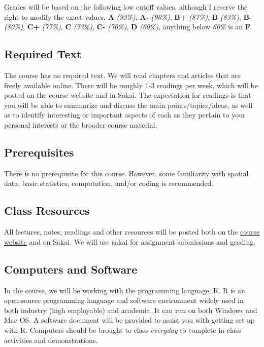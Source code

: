 \documentclass[11pt,]{article}
\begin{document}
Grades will be based on the following low cutoff values, although I
reserve the right to modify the exact values: \textbf{A} \emph{(93\%)},
\textbf{A-} \emph{(90\%)}, \textbf{B+} \emph{(87\%)}, \textbf{B}
\emph{(83\%)}, \textbf{B-} \emph{(80\%)}, \textbf{C+} \emph{(77\%)},
\textbf{C} \emph{(73\%)}, \textbf{C-} \emph{(70\%)}, \textbf{D}
\emph{(60\%)}, anything below \emph{60\%} is an \textbf{F}

\hypertarget{required-text}{%
\subsection{Required Text}\label{required-text}}

The course has no required text. We will read chapters and articles that
are freely available online. There will be roughly 1-3 readings per
week, which will be posted on the course website and in Sakai. The
expectation for readings is that you will be able to summarize and
discuss the main points/topics/ideas, as well as to identify interesting
or important aspects of each as they pertain to your personal interests
or the broader course material.

\hypertarget{prerequisites}{%
\subsection{Prerequisites}\label{prerequisites}}

There is no prerequisite for this course. However, some familiarity with
spatial data, basic statistics, computation, and/or coding is
recommended.

\hypertarget{class-resources}{%
\subsection{Class Resources}\label{class-resources}}

All lectures, notes, readings and other resources will be posted both on
the \href{geog215-spds.rbind.io}{course website} and on Sakai. We will
use sakai for assignment submissions and grading.

\hypertarget{computers-and-software}{%
\subsection{Computers and Software}\label{computers-and-software}}

In the course, we will be working with the programming language, R. R is
an open-source programming language and software environment widely used
in both industry (high employable) and academia. It can run on both
Windows and Mac OS. A software document will be provided to assist you
with getting set up with R. Computers should be brought to class
\emph{everyday} to complete in-class activities and demonstrations.
\end{document}
